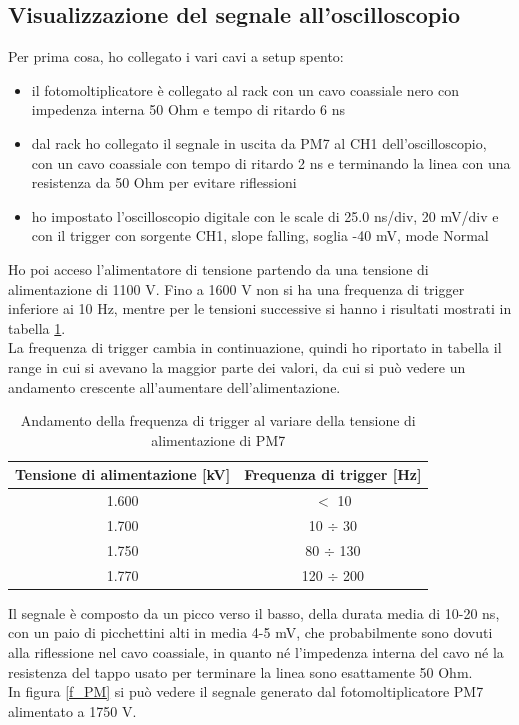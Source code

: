 \documentclass{article}
\begin{document}
\subsection{Visualizzazione del segnale all'oscilloscopio}
Per prima cosa, ho collegato i vari cavi a setup spento: 
\begin{itemize}
    \item il fotomoltiplicatore è collegato al rack con un cavo coassiale nero con impedenza interna 50 Ohm e tempo di ritardo 6 ns
    \item dal rack ho collegato il segnale in uscita da PM7 al CH1 dell'oscilloscopio, con un cavo coassiale con tempo di ritardo 2 ns e terminando la linea con una resistenza da 50 Ohm per evitare riflessioni
    \item ho impostato l'oscilloscopio digitale con le scale di 25.0 ns/div, 20 mV/div e con il trigger con sorgente CH1, slope falling, soglia -40 mV, mode Normal
\end{itemize}
Ho poi acceso l'alimentatore di tensione partendo da una tensione di alimentazione di 1100 V. Fino a 1600 V non si ha una frequenza di trigger inferiore ai 10 Hz, mentre per le tensioni successive si hanno i risultati mostrati in tabella \ref{tabal}. \\
La frequenza di trigger cambia in continuazione, quindi ho riportato in tabella il range in cui si avevano la maggior parte dei valori, da cui si può vedere un andamento crescente all'aumentare dell'alimentazione. 

\begin{table}[h!]
\begin{center}
\begin{tabular}{|c|c|}
\hline
Tensione di alimentazione [kV] & Frequenza di trigger [Hz]\\
\hline
     1.600 & $<$ 10   \\
    1.700 & 10 $\div$ 30\\
    1.750  & 80 $\div$ 130\\
    1.770  & 120 $\div$ 200\\
    \hline
\end{tabular}
\end{center}
\caption{Andamento della frequenza di trigger al variare della tensione di alimentazione di PM7}\label{tabal}
\end{table}


Il segnale è composto da un picco verso il basso, della durata media di 10-20 ns, con un paio di picchettini alti in media 4-5 mV, che probabilmente sono dovuti alla riflessione nel cavo coassiale, in quanto né l'impedenza interna del cavo né la resistenza del tappo usato per terminare la linea sono esattamente 50 Ohm.\\
In figura \ref{f_PM} si può vedere il segnale generato dal fotomoltiplicatore PM7 alimentato a 1750 V.
\end{document}
